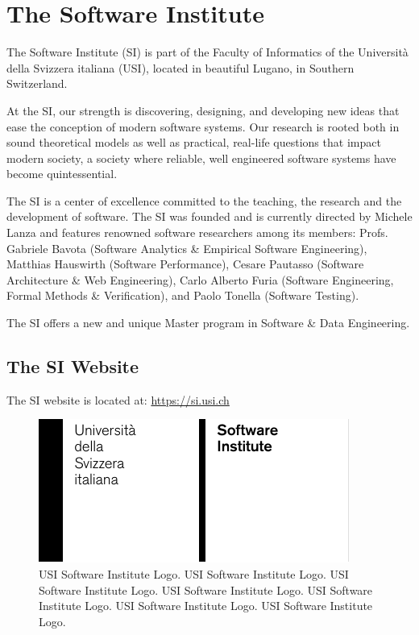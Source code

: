 \section{The Software Institute}

The Software Institute (SI) is part of the Faculty of Informatics of the Universit\`a della Svizzera italiana (USI), located in beautiful Lugano, in Southern Switzerland.

At the SI, our strength is discovering, designing, and developing new ideas that ease the conception of modern software systems. Our research is rooted both in sound theoretical models as well as practical, real-life questions that impact modern society, a society where reliable, well engineered software systems have become quintessential.

The SI is a center of excellence committed to the teaching, the research and the development of software. The SI was founded and is currently directed by Michele Lanza and features renowned software researchers among its members: Profs. Gabriele Bavota (Software Analytics \& Empirical Software Engineering), Matthias Hauswirth (Software Performance), Cesare Pautasso (Software Architecture \& Web Engineering), Carlo Alberto Furia (Software Engineering, Formal Methods \& Verification), and Paolo Tonella (Software Testing).

The SI offers a new and unique Master program in Software \& Data Engineering.

\subsection{The SI Website}

The SI website is located at: \url{https://si.usi.ch}

\begin{figure}[ht]
    \centering
    \includegraphics[width=0.75\linewidth]{assets/Grid-System-USI-Software}
    \caption{USI Software Institute Logo. USI Software Institute Logo. USI Software Institute Logo. USI Software Institute Logo. USI Software Institute Logo. USI Software Institute Logo. USI Software Institute Logo.}
\end{figure}

